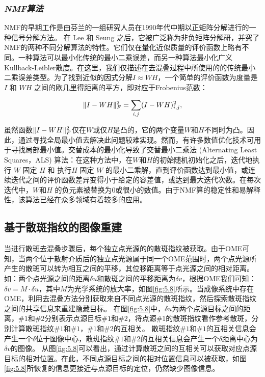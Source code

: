 \subsubsection*{\textbf{\textit{NMF算法}}}

NMF的早期工作是由芬兰的一组研究人员\cite{paatero_positive_1994}在1990年代中期以正矩阵分解进行的一种信号分解方法。 在 Lee 和 Seung 之后\cite{paatero_positive_1994}，它被广泛称为非负矩阵分解研，并究了NMF的两种不同分解算法的特性\cite{lee_learning_1999,lee_algorithms_2001}。它们仅在量化近似质量的评价函数上略有不同。一种算法可以最小化传统的最小二乘误差，而另一种算法最小化广义Kullback-Leibler散度。在这里，我们仅描述在去混叠过程中所使用的的传统最小二乘误差类型。为了找到近似的因式分解$I \approx WH$，一个简单的评价函数为度量是 $I$ 和 $WH$ 之间的欧几里得距离的平方，即对应于Frobenius范数：

\begin{equation}
	\begin{aligned}
\Arrowvert I -WH\Arrowvert_F^{2} = \sum_{i,j} (I -WH)_{i,j}^2,
\label{eq:5.3}
\end{aligned}
\end{equation}

虽然函数$\Arrowvert I -WH\Arrowvert_F^{2}$仅在$W$或仅$H$是凸的，它的两个变量$W$和$H$不同时为凸。因此，通过寻找全局最小值去解决此问题较难实现。然而，有许多数值优化技术可用于寻找局部最小值。交替成本的最小化导致了交替最小二乘法 (Alternating Least Squares，ALS) 算法：在这种方法中，在$W$和$H$的初始随机初始化之后，迭代地执行 $W$ 固定 $H$ 和 执行$H$ 固定 $W$ 的最小二乘解，直到评价函数达到最小值，或连续迭代之间的评价函数差异变得小于给定的容差值，或达到最大迭代次数。在每次迭代中，$W$和$H$ 的负元素被替换为$0$或很小的数值。由于NMF算的稳定性和易解释性，该算法已经在众多领域有着较多的应用。

\subsection{基于散斑指纹的图像重建}

当进行散斑去混叠步骤后，每个独立点光源的的散斑指纹被获取。由于OME\cite{Freund1988,katz_non-invasive_2014,bertolotti_non-invasive_2012}可知，当两个位于散射介质后的独立点光源属于同一个OME范围时，两个点光源所产生的散斑可以转为相互之间的平移，其位移距离等于点光源之间的相对距离。如：两个点光源之间的距离$\delta u$和散斑之间的平移距离为$\delta v$，根据OME我们可知：$\delta v = M \cdot \delta u$，其中$M$为光学系统的放大率，如图\ref{fig:5.8}所示。当成像系统中存在OME，利用去混叠方法分别获取来自不同点光源的散斑指纹，然后探索散斑指纹之间的共享信息来重建隐藏目标。
在图\ref{fig:5.8}中，$\delta u$为两个点源目标之间的距离，$\# 1$和$\# 2$分别表示点源目标$\# 1$和$\# 2$，将点源$\# 1$的散斑指纹看作参考散斑，分别计算散斑指纹$\# 1$和$\# 1$，$\# 1$和$\# 2$的互相关。
散斑指纹$\# 1$和$\# 1$的互相关信息会产生一个$\delta $位于图像中心，散斑指纹$\# 1$和$\# 2$的互相关信息会产生一个$\delta $距离中心为$\delta v$的图像。
从图\ref{fig:5.8}可以看出，通过计算散斑之间的互相关可以获取对应点源目标的相对位置。在此，不同点源目标之间的相对位置信息可以被获取，如图\ref{fig:5.8}所恢复的信息更接近与点源目标的定位，仍然缺少图像信息。

